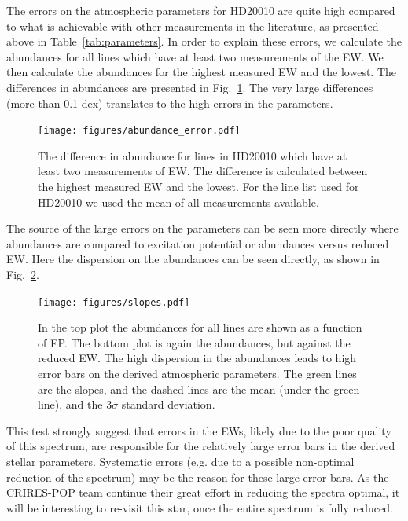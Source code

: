 \documentclass{aa}
\begin{document}
The errors on the atmospheric parameters for HD20010 are quite
high compared to what is achievable with other measurements in the
literature, as presented above in Table~\ref{tab:parameters}. In order to
explain these errors, we calculate the abundances for all lines
which have at least two measurements of the EW. We then calculate the
abundances for the highest measured EW and the lowest. The differences
in abundances are presented in Fig.~\ref{fig:abundance_error}. The
very large differences (more than 0.1 dex) translates to the high errors in
the parameters.

\begin{figure}[tpb!]
    \centering
    \texttt{[image: figures/abundance\_error.pdf]}
    \caption{The difference in abundance for lines in HD20010 which
    have at least two measurements of EW. The difference is calculated
    between the highest measured EW and the lowest. For the line list
    used for HD20010 we used the mean of all measurements available.}
    \label{fig:abundance_error}
\end{figure}

The source of the large errors on the parameters can be seen more directly
where abundances are compared to excitation potential or abundances versus
reduced EW. Here the dispersion on the abundances can be seen directly,
as shown in Fig.~\ref{fig:slopes}.

\begin{figure}[tpb!]
    \centering
    \texttt{[image: figures/slopes.pdf]}
    \caption{In the top plot the  abundances for all
    lines are shown as a function of EP. The bottom plot is again
    the  abundances, but against the reduced EW. The high
    dispersion in the abundances leads to high error bars on the derived
    atmospheric parameters. The green lines are the slopes, and the
    dashed lines are the mean (under the green line), and the $3 \sigma$
    standard deviation.}
    \label{fig:slopes}
\end{figure}

This test strongly suggest that errors in the EWs, likely due to the
poor quality of this spectrum, are responsible for the relatively large
error bars in the derived stellar parameters. Systematic errors (e.g.
due to a possible non-optimal reduction of the spectrum) may be the
reason for these large error bars. As the CRIRES-POP team continue their
great effort in reducing the spectra optimal, it will be interesting
to re-visit this star, once the entire spectrum is fully reduced.
\end{document}
